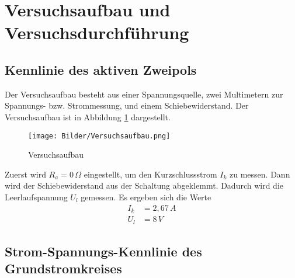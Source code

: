 \section{Versuchsaufbau und Versuchsdurchführung}

\subsection{Kennlinie des aktiven Zweipols}
Der Versuchsaufbau besteht aus einer Spannungsquelle, zwei Multimetern zur Spannungs- bzw. Strommessung, und einem Schiebewiderstand. Der Versuchsaufbau ist in Abbildung \ref{fig:versuchsaufbau} dargestellt.
\begin{figure}[ht]
    \centering
    \texttt{[image: Bilder/Versuchsaufbau.png]}
    \caption{Versuchsaufbau}
    \label{fig:versuchsaufbau}
\end{figure}

Zuerst wird $R_a=0\,\Omega$ eingestellt, um den Kurzschlussstrom $I_k$ zu messen. Dann wird der Schiebewiderstand aus der Schaltung abgeklemmt. Dadurch wird die Leerlaufspannung $U_l$ gemessen.
Es ergeben sich die Werte
\begin{align*}
    I_k & = 2,67\,A \\
    U_l & = 8\,V
\end{align*}

\subsection{Strom-Spannungs-Kennlinie des Grundstromkreises}

